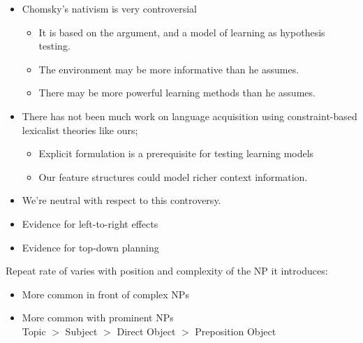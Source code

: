 \documentclass[a4paper,landscape,headrule,footrule,dvips]{foils}
\begin{document}

\begin{itemize}
\item Chomsky’s nativism is very controversial
  \begin{itemize}
  \item It is based on the  argument, and a 
    model of learning as hypothesis testing.  
  \item The environment may be more informative than he assumes.
  \item There may be more powerful learning methods than he 
    assumes.
  \end{itemize}
\item There has not been much work on language acquisition 
  using constraint-based lexicalist theories like ours;  
  \begin{itemize}
  \item Explicit formulation is a prerequisite for testing learning models
  \item Our feature structures could model richer context information.
  \end{itemize}
\item We’re neutral with respect to this controversy.
\end{itemize}



\begin{itemize}
\item Evidence for left-to-right effects
\item Evidence for top-down planning
\end{itemize}


Repeat rate of  varies with position and complexity of the NP it
introduces:


\begin{itemize}
\item More common in front of complex NPs
\item More common with prominent NPs
  \\ Topic $>$ Subject $>$ Direct Object $>$ Preposition Object
\end{itemize}

\begin{exe}
  \ex {}
\end{exe}
\end{document}
